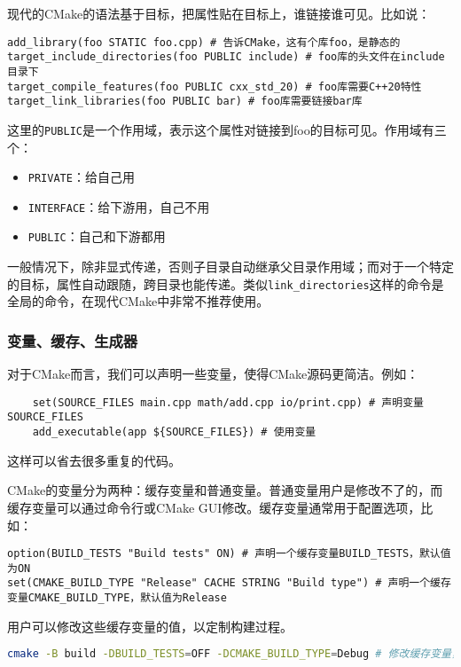 \documentclass[../main.tex]{subfiles}
\begin{document}
现代的CMake的语法基于目标，把属性贴在目标上，谁链接谁可见。比如说：
\begin{lstlisting}
add_library(foo STATIC foo.cpp) # 告诉CMake，这有个库foo，是静态的
target_include_directories(foo PUBLIC include) # foo库的头文件在include目录下
target_compile_features(foo PUBLIC cxx_std_20) # foo库需要C++20特性
target_link_libraries(foo PUBLIC bar) # foo库需要链接bar库
\end{lstlisting}

这里的\texttt{PUBLIC}是一个作用域，表示这个属性对链接到foo的目标可见。作用域有三个：
\begin{itemize}
    \item \texttt{PRIVATE}：给自己用
    \item \texttt{INTERFACE}：给下游用，自己不用
    \item \texttt{PUBLIC}：自己和下游都用
\end{itemize}

一般情况下，除非显式传递，否则子目录自动继承父目录作用域；而对于一个特定的目标，属性自动跟随，跨目录也能传递。类似\texttt{link\_directories}这样的命令是全局的命令，在现代CMake中非常不推荐使用。

\subsubsection{变量、缓存、生成器}

对于CMake而言，我们可以声明一些变量，使得CMake源码更简洁。例如：
\begin{lstlisting}
    set(SOURCE_FILES main.cpp math/add.cpp io/print.cpp) # 声明变量SOURCE_FILES
    add_executable(app ${SOURCE_FILES}) # 使用变量
\end{lstlisting}
这样可以省去很多重复的代码。

CMake的变量分为两种：缓存变量和普通变量。普通变量用户是修改不了的，而缓存变量可以通过命令行或CMake GUI修改。缓存变量通常用于配置选项，比如：
\begin{lstlisting}
option(BUILD_TESTS "Build tests" ON) # 声明一个缓存变量BUILD_TESTS，默认值为ON
set(CMAKE_BUILD_TYPE "Release" CACHE STRING "Build type") # 声明一个缓存变量CMAKE_BUILD_TYPE，默认值为Release
\end{lstlisting}

用户可以修改这些缓存变量的值，以定制构建过程。
\begin{lstlisting}[language=bash]
cmake -B build -DBUILD_TESTS=OFF -DCMAKE_BUILD_TYPE=Debug # 修改缓存变量，将BUILD_TESTS设置为OFF，将CMAKE_BUILD_TYPE设置为Debug
\end{lstlisting}
\end{document}
